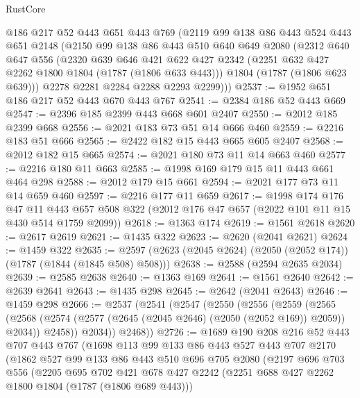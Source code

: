 \begin{lexlean}{RustCore}
\begin{coremodule}
    @186
    @217
    @52
    @443
    @651
    @443
    @769
    (@2119
      @99
      @138
      @86
      @443
      @524
      @443
      @651
      @2148
      (@2150
        @99
        @138
        @86
        @443
        @510
        @640
        @649
        @2080
        (@2312
          @640
          @647
          @556
          (@2320
            @639
            @646
            @421
            @622
            @427
            @2342
            (@2251 @632 @427 @2262 @1800 @1804 (@1787 (@1806 @633 @443)))
            @1804
            (@1787 (@1806 @623 @639)))
          @2278
          @2281
          @2284
          @2288
          @2293
          @2299)))
@2537 := @1952 @651 @186 @217 @52 @443 @670 @443 @767
@2541 := @2384 @186 @52 @443 @669
@2547 := @2396 @185 @2399 @443 @668 @601 @2407
@2550 := @2012 @185 @2399 @668
@2556 := @2021 @183 @73 @51 @14 @666 @460
@2559 := @2216 @183 @51 @666
@2565 := @2422 @182 @15 @443 @665 @605 @2407
@2568 := @2012 @182 @15 @665
@2574 := @2021 @180 @73 @11 @14 @663 @460
@2577 := @2216 @180 @11 @663
@2585 := @1998 @169 @179 @15 @11 @443 @661 @464 @298
@2588 := @2012 @179 @15 @661
@2594 := @2021 @177 @73 @11 @14 @659 @460
@2597 := @2216 @177 @11 @659
@2617 := @1998
    @174
    @176
    @47
    @11
    @443
    @657
    @508
    @322
    (@2012 @176 @47 @657 (@2022 @101 @11 @15 @430 @514 @1759 @2099))
@2618 := @1363 @174
@2619 := @1561 @2618
@2620 := @2617 @2619
@2621 := @1435 @322
@2623 := @2620 (@2041 @2621)
@2624 := @1459 @322
@2635 := @2597 (@2623 (@2045 @2624) (@2050 (@2052 @174)) (@1787 (@1844 (@1845 @508) @508)))
@2638 := @2588 (@2594 @2635 @2034)
@2639 := @2585 @2638
@2640 := @1363 @169
@2641 := @1561 @2640
@2642 := @2639 @2641
@2643 := @1435 @298
@2645 := @2642 (@2041 @2643)
@2646 := @1459 @298
@2666 := @2537
    (@2541
      (@2547
        (@2550
          (@2556
            (@2559
              (@2565
                (@2568 (@2574 (@2577 (@2645 (@2045 @2646) (@2050 (@2052 @169)) @2059)) @2034))
                @2458))
            @2034))
        @2468))
@2726 := @1689
    @190
    @208
    @216
    @52
    @443
    @707
    @443
    @767
    (@1698
      @113
      @99
      @133
      @86
      @443
      @527
      @443
      @707
      @2170
      (@1862
        @527
        @99
        @133
        @86
        @443
        @510
        @696
        @705
        @2080
        (@2197
          @696
          @703
          @556
          (@2205
            @695
            @702
            @421
            @678
            @427
            @2242
            (@2251 @688 @427 @2262 @1800 @1804 (@1787 (@1806 @689 @443)))

\end{coremodule}
\end{lexlean}
